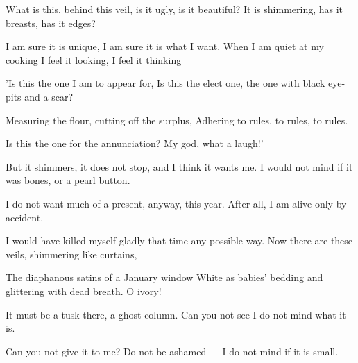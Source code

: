 \documentclass[10pt]{article}
\begin{document}
\begin{poem}
  \begin{stanza}
    What is this, behind this veil, is it ugly, is it beautiful?\verseline
    It is shimmering, has it breasts, has it edges?
  \end{stanza}
  \begin{stanza}
    I am sure it is unique, I am sure it is what I want.\verseline
    When I am quiet at my cooking I feel it looking, I feel it thinking
  \end{stanza}
  \begin{stanza}
    'Is this the one I am to appear for,\verseline
    Is this the elect one, the one with black eye-pits and a scar?
  \end{stanza}
  \begin{stanza}
    Measuring the flour, cutting off the surplus,\verseline
    Adhering to rules, to rules, to rules.
  \end{stanza}
  \begin{stanza}
    Is this the one for the annunciation?\verseline
    My god, what a laugh!'
  \end{stanza}
  \begin{stanza}
    But it shimmers, it does not stop, and I think it wants me.\verseline
    I would not mind if it was bones, or a pearl button.
  \end{stanza}
  \begin{stanza}
    I do not want much of a present, anyway, this year.\verseline
    After all, I am alive only by accident.
  \end{stanza}
  \begin{stanza}
    I would have killed myself gladly that time any possible way.\verseline
    Now there are these veils, shimmering like curtains,
  \end{stanza}
  \begin{stanza}
    The diaphanous satins of a January window\verseline
    White as babies' bedding and glittering with dead breath. O ivory!
  \end{stanza}
  \begin{stanza}
    It must be a tusk there, a ghost-column.\verseline
    Can you not see I do not mind what it is.
  \end{stanza}
  \begin{stanza}
    Can you not give it to me?\verseline
    Do not be ashamed --- I do not mind if it is small.
  \end{stanza}

\end{poem}
\end{document}
